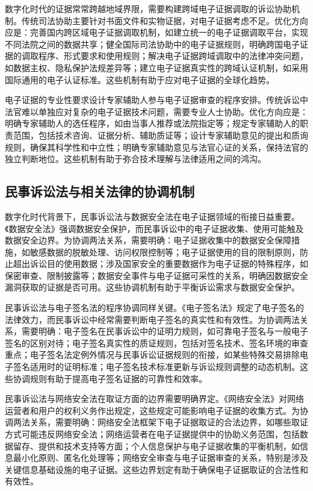 数字化时代的证据常常跨越地域界限，需要构建跨域电子证据调取的诉讼协助机制。传统司法协助主要针对书面文件和实物证据，对电子证据考虑不足。优化方向应是：完善国内跨区域电子证据调取机制，如建立统一的电子证据调取平台，实现不同法院之间的数据共享；健全国际司法协助中的电子证据规则，明确跨国电子证据的调取程序、形式要求和使用规则；解决电子证据跨域调取中的法律冲突问题，如数据主权、隐私保护法规差异等；建立电子证据真实性的跨域认证机制，如采用国际通用的电子认证标准。这些机制有助于应对电子证据的全球化趋势。

电子证据的专业性要求设计专家辅助人参与电子证据审查的程序安排。传统诉讼中法官难以单独应对复杂的电子证据技术问题，需要专业人士协助。优化方向应是：明确专家辅助人的选任程序，如由当事人推荐或法院指定等；规定专家辅助人的职责范围，包括技术咨询、证据分析、辅助质证等；设计专家辅助意见的提出和质询规则，确保其科学性和中立性；明确专家辅助意见与法官心证的关系，保持法官的独立判断地位。这些机制有助于弥合技术理解与法律适用之间的鸿沟。

\subsection{民事诉讼法与相关法律的协调机制}

数字化时代背景下，民事诉讼法与数据安全法在电子证据领域的衔接日益重要。《数据安全法》强调数据安全保护，而民事诉讼中的电子证据收集、使用可能触及数据安全边界。为协调两法关系，需要明确：电子证据收集中的数据安全保障措施，如敏感数据的脱敏处理、访问权限控制等；电子证据使用的目的限制原则，防止超出诉讼目的使用数据；涉及国家安全的重要数据作为电子证据的特殊程序，如保密审查、限制披露等；数据安全事件与电子证据可采性的关系，明确因数据安全漏洞获取的证据是否可用。这些协调机制有助于平衡诉讼需求与数据安全保护。

民事诉讼法与电子签名法的程序协调同样关键。《电子签名法》规定了电子签名的法律效力，而民事诉讼中经常需要判断电子签名的真实性和有效性。为协调两法关系，需要明确：电子签名在民事诉讼中的证明力规则，如可靠电子签名与一般电子签名的区别对待；电子签名真实性的质证规则，包括对签名技术、签名环境的审查重点；电子签名法定例外情况与民事诉讼证据规则的衔接，如某些特殊交易排除电子签名适用时的证明标准；电子签名技术标准更新与诉讼规则调整的动态机制。这些协调规则有助于提高电子签名证据的可靠性和效率。

民事诉讼法与网络安全法在取证方面的边界需要明确界定。《网络安全法》对网络运营者和用户的权利义务作出规定，这些规定可能影响电子证据的收集方式。为协调两法关系，需要明确：网络安全法框架下电子证据取证的合法边界，如哪些取证方式可能违反网络安全法；网络运营者在电子证据提供中的协助义务范围，包括数据留存、提供和技术支持等方面；个人信息保护与电子证据收集的平衡机制，如信息最小化原则、匿名化处理等；网络安全审查与电子证据审查的关系，特别是涉及关键信息基础设施的电子证据。这些边界划定有助于确保电子证据取证的合法性和有效性。

